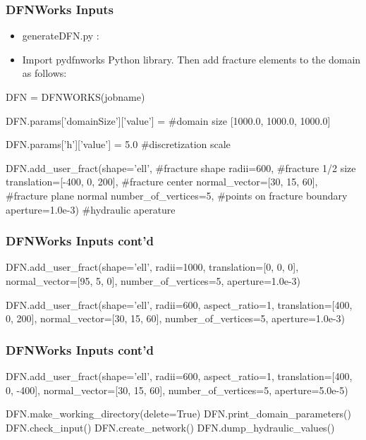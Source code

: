 \documentclass{beamer}
\newcommand\bluecomment[1]{{{\color{blue} #1}}}
\begin{document}
\begin{frame}\frametitle{DFNWorks Inputs}
	
	\begin{itemize}
		\item \begin{semiverbatim}generateDFN.py :\end{semiverbatim}
		\item Import pydfnworks Python library. Then add fracture elements to the domain as follows:
	\end{itemize}
	
	\begin{semiverbatim}
		DFN = DFNWORKS(jobname)
		
		DFN.params['domainSize']['value'] =  \bluecomment{#domain size}
							[1000.0, 1000.0, 1000.0]
		
		DFN.params['h']['value'] = 5.0  \bluecomment{#discretization scale}
		
		DFN.add_user_fract(shape='ell', \bluecomment{#fracture shape}
			radii=600,                    \bluecomment{#fracture 1/2 size}
			translation=[-400, 0, 200],      \bluecomment{#fracture center}
			normal_vector=[30, 15, 60],      \bluecomment{#fracture plane normal}
			number_of_vertices=5,     \bluecomment{#points on fracture boundary}
			aperture=1.0e-3)      \bluecomment{#hydraulic aperature}   
			
	\end{semiverbatim}
	
\end{frame}

\begin{frame} \frametitle{DFNWorks Inputs cont'd}
		\begin{semiverbatim}
					
		DFN.add_user_fract(shape='ell',
		radii=1000,
		translation=[0, 0, 0],
		normal_vector=[95, 5, 0],
		number_of_vertices=5,
		aperture=1.0e-3)
		
		DFN.add_user_fract(shape='ell',
		radii=600,
		aspect_ratio=1,
		translation=[400, 0, 200],
		normal_vector=[30, 15, 60],
		number_of_vertices=5,
		aperture=1.0e-3)

	\end{semiverbatim}
\end{frame}

\begin{frame} \frametitle{DFNWorks Inputs cont'd}
	\begin{semiverbatim}
		
		DFN.add_user_fract(shape='ell',
		radii=600,
		aspect_ratio=1,
		translation=[400, 0, -400],
		normal_vector=[30, 15, 60],
		number_of_vertices=5,
		aperture=5.0e-5)
		
		DFN.make_working_directory(delete=True)
		DFN.print_domain_parameters()
		DFN.check_input()
		DFN.create_network()
		DFN.dump_hydraulic_values()
		
	\end{semiverbatim}
\end{frame}
\end{document}
